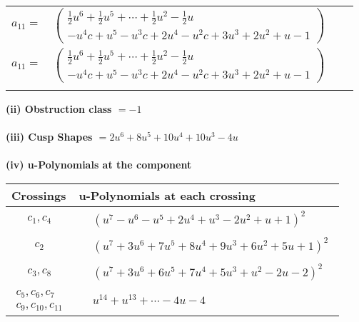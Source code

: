 \documentclass[1p]{elsarticle_modified}
\theoremstyle{definition}
\begin{document}
\begin{tabular}{m{7pt} m{180pt} m{7pt} m{180pt} }
\flushright $a_{11}=$&$\begin{pmatrix}\frac{1}{2} u^6+\frac{1}{2} u^5+\cdots+\frac{1}{2} u^2-\frac{1}{2} u\\- u^4 c+u^5- u^3 c+2 u^4- u^2 c+3 u^3+2 u^2+u-1\end{pmatrix}$\\ \flushright $a_{11}=$&$\begin{pmatrix}\frac{1}{2} u^6+\frac{1}{2} u^5+\cdots+\frac{1}{2} u^2-\frac{1}{2} u\\- u^4 c+u^5- u^3 c+2 u^4- u^2 c+3 u^3+2 u^2+u-1\end{pmatrix}$\\&\end{tabular}
\flushleft \textbf{(ii) Obstruction class $= -1$}\\~\\
\flushleft \textbf{(iii) Cusp Shapes $= 2 u^6+8 u^5+10 u^4+10 u^3-4 u$}\\~\\
\newpage\renewcommand{\arraystretch}{1}
\flushleft \textbf{(iv) u-Polynomials at the component}\newline \\
\begin{tabular}{m{50pt}|m{274pt}}
Crossings & \hspace{64pt}u-Polynomials at each crossing \\
\hline $$\begin{aligned}c_{1},c_{4}\end{aligned}$$&$\begin{aligned}
&(u^7- u^6- u^5+2 u^4+u^3-2 u^2+u+1)^2
\end{aligned}$\\
\hline $$\begin{aligned}c_{2}\end{aligned}$$&$\begin{aligned}
&(u^7+3 u^6+7 u^5+8 u^4+9 u^3+6 u^2+5 u+1)^2
\end{aligned}$\\
\hline $$\begin{aligned}c_{3},c_{8}\end{aligned}$$&$\begin{aligned}
&(u^7+3 u^6+6 u^5+7 u^4+5 u^3+u^2-2 u-2)^2
\end{aligned}$\\
\hline $$\begin{aligned}c_{5},c_{6},c_{7}\\c_{9},c_{10},c_{11}\end{aligned}$$&$\begin{aligned}
&u^{14}+u^{13}+\cdots-4 u-4
\end{aligned}$\\
\hline
\end{tabular}\\~\\
\end{document}
